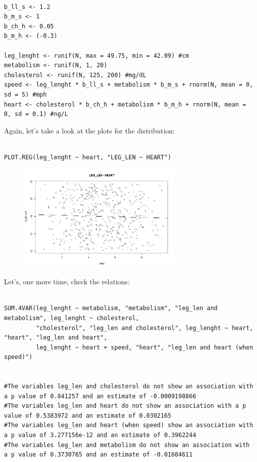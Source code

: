 \documentclass{article}
\begin{document}
\begin{lstlisting}

b_ll_s <- 1.2
b_m_s <- 1
b_ch_h <- 0.05
b_m_h <- (-0.3)

leg_lenght <- runif(N, max = 49.75, min = 42.09) #cm
metabolism <- runif(N, 1, 20) 
cholesterol <- runif(N, 125, 200) #mg/dL
speed <- leg_lenght * b_ll_s + metabolism * b_m_s + rnorm(N, mean = 0, sd = 5) #mph
heart <- cholesterol * b_ch_h + metabolism * b_m_h + rnorm(N, mean = 0, sd = 0.1) #ng/L

\end{lstlisting}

Again, let's take a look at the plots for the distribution:

\begin{lstlisting}

PLOT.REG(leg_lenght ~ heart, "LEG_LEN ~ HEART")

\end{lstlisting}


\begin{figure}[h]
\includegraphics[width=8cm]{PLOT_RUNNER.png}
\centering
\end{figure}



Let's, one more time, check the relations:

\begin{lstlisting}

SUM.4VAR(leg_lenght ~ metabolism, "metabolism", "leg_len and metabolism", leg_lenght ~ cholesterol,
         "cholesterol", "leg_len and cholesterol", leg_lenght ~ heart, "heart", "leg_len and heart", 
         leg_lenght ~ heart + speed, "heart", "leg_len and heart (when speed)")


#The variables leg_len and cholesterol do not show an association with a p value of 0.841257 and an estimate of -0.0009198866 
#The variables leg_len and heart do not show an association with a p value of 0.5383972 and an estimate of 0.0302165 
#The variables leg_len and heart (when speed) show an association with a p value of 3.277156e-12 and an estimate of 0.3962244 
#The variables leg_len and metabolism do not show an association with a p value of 0.3730765 and an estimate of -0.01604611 

\end{lstlisting}
\end{document}
